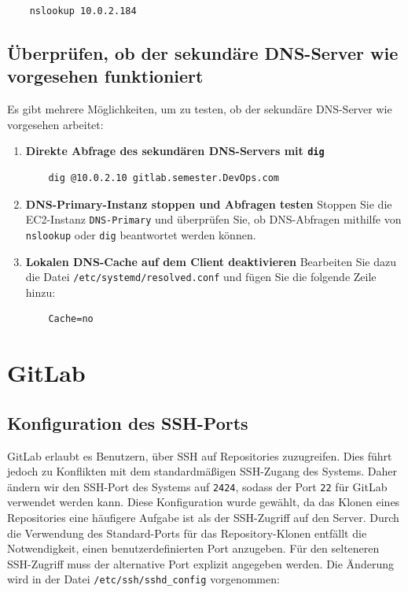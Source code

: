 \documentclass[a4paper,12pt]{article}
\begin{document}
\begin{verbatim}
	nslookup 10.0.2.184
\end{verbatim}


\subsection{Überprüfen, ob der sekundäre DNS-Server wie vorgesehen funktioniert}  
Es gibt mehrere Möglichkeiten, um zu testen, ob der sekundäre DNS-Server wie vorgesehen arbeitet:  

\begin{enumerate}  
    \item \textbf{Direkte Abfrage des sekundären DNS-Servers mit \texttt{dig}}  
    \begin{verbatim}
    dig @10.0.2.10 gitlab.semester.DevOps.com
    \end{verbatim}  

    \item \textbf{DNS-Primary-Instanz stoppen und Abfragen testen}  
    Stoppen Sie die EC2-Instanz \texttt{DNS-Primary} und überprüfen Sie, ob DNS-Abfragen mithilfe von \texttt{nslookup} oder \texttt{dig} beantwortet werden können.  

    \item \textbf{Lokalen DNS-Cache auf dem Client deaktivieren}  
    Bearbeiten Sie dazu die Datei \texttt{/etc/systemd/resolved.conf} und fügen Sie die folgende Zeile hinzu:  
    \begin{verbatim}
    Cache=no
    \end{verbatim}  
\end{enumerate} 




\newpage

\section{GitLab}

\subsection{Konfiguration des SSH-Ports}
GitLab erlaubt es Benutzern, über SSH auf Repositories zuzugreifen. Dies führt jedoch zu Konflikten mit dem standardmäßigen SSH-Zugang des Systems. Daher ändern wir den SSH-Port des Systems auf \texttt{2424}, sodass der Port \texttt{22} für GitLab verwendet werden kann.
Diese Konfiguration wurde gewählt, da das Klonen eines Repositories eine häufigere Aufgabe ist als der SSH-Zugriff auf den Server. Durch die Verwendung des Standard-Ports für das Repository-Klonen entfällt die Notwendigkeit, einen benutzerdefinierten Port anzugeben. Für den selteneren SSH-Zugriff muss der alternative Port explizit angegeben werden.
Die Änderung wird in der Datei \texttt{/etc/ssh/sshd\_config} vorgenommen:
\end{document}

